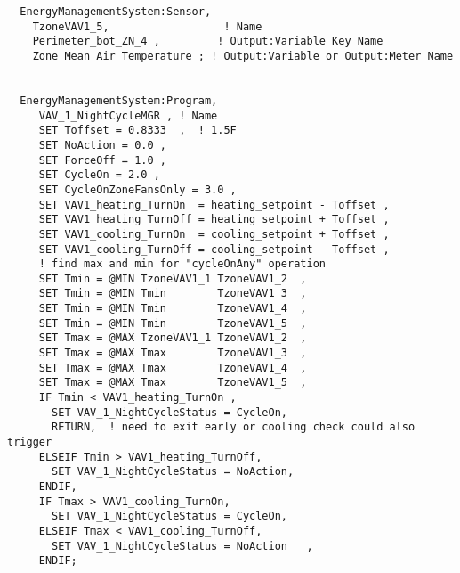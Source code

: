 \begin{lstlisting}
  EnergyManagementSystem:Sensor,
    TzoneVAV1_5,                  ! Name
    Perimeter_bot_ZN_4 ,         ! Output:Variable Key Name
    Zone Mean Air Temperature ; ! Output:Variable or Output:Meter Name


  EnergyManagementSystem:Program,
     VAV_1_NightCycleMGR , ! Name
     SET Toffset = 0.8333  ,  ! 1.5F
     SET NoAction = 0.0 ,
     SET ForceOff = 1.0 ,
     SET CycleOn = 2.0 ,
     SET CycleOnZoneFansOnly = 3.0 ,
     SET VAV1_heating_TurnOn  = heating_setpoint - Toffset ,
     SET VAV1_heating_TurnOff = heating_setpoint + Toffset ,
     SET VAV1_cooling_TurnOn  = cooling_setpoint + Toffset ,
     SET VAV1_cooling_TurnOff = cooling_setpoint - Toffset ,
     ! find max and min for "cycleOnAny" operation
     SET Tmin = @MIN TzoneVAV1_1 TzoneVAV1_2  ,
     SET Tmin = @MIN Tmin        TzoneVAV1_3  ,
     SET Tmin = @MIN Tmin        TzoneVAV1_4  ,
     SET Tmin = @MIN Tmin        TzoneVAV1_5  ,
     SET Tmax = @MAX TzoneVAV1_1 TzoneVAV1_2  ,
     SET Tmax = @MAX Tmax        TzoneVAV1_3  ,
     SET Tmax = @MAX Tmax        TzoneVAV1_4  ,
     SET Tmax = @MAX Tmax        TzoneVAV1_5  ,
     IF Tmin < VAV1_heating_TurnOn ,
       SET VAV_1_NightCycleStatus = CycleOn,
       RETURN,  ! need to exit early or cooling check could also trigger
     ELSEIF Tmin > VAV1_heating_TurnOff,
       SET VAV_1_NightCycleStatus = NoAction,
     ENDIF,
     IF Tmax > VAV1_cooling_TurnOn,
       SET VAV_1_NightCycleStatus = CycleOn,
     ELSEIF Tmax < VAV1_cooling_TurnOff,
       SET VAV_1_NightCycleStatus = NoAction   ,
     ENDIF;
\end{lstlisting}
